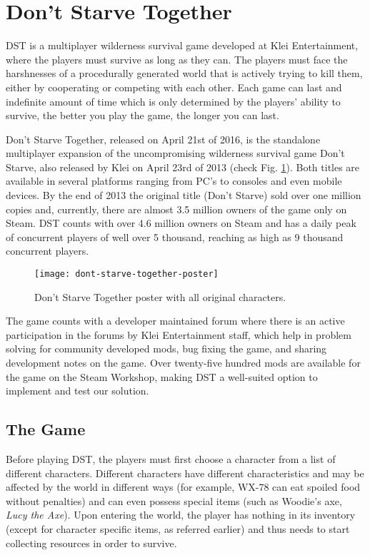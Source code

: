 \section{Don't Starve Together}
\ac{DST} is a multiplayer wilderness survival game developed at Klei Entertainment, where the players must survive as long as they can.
The players must face the harshnesses of a procedurally generated world that is actively trying to kill them, either by cooperating or competing with each other.
Each game can last and indefinite amount of time which is only determined by the players' ability to survive, the better you play the game, the longer you can last.

Don't Starve Together, released on April 21st of 2016, is the standalone multiplayer expansion of the uncompromising wilderness survival game Don't Starve, also released by Klei on April 23rd of 2013 (check Fig. \ref{fig:don't-starve-together-poster}).
Both titles are available in several platforms ranging from PC's to consoles and even mobile devices.
By the end of 2013 the original title (Don't Starve) sold over one million copies and, currently, there are almost 3.5 million owners of the game only on Steam.
\ac{DST} counts with over 4.6 million owners on Steam and has a daily peak of concurrent players of well over 5 thousand, reaching as high as 9 thousand concurrent players.

\begin{figure}
  \centering
    \texttt{[image: dont-starve-together-poster]}
  \caption{Don't Starve Together poster with all original characters.}
  \label{fig:don't-starve-together-poster}
\end{figure}

The game counts with a developer maintained forum where there is an active participation in the forums by Klei Entertainment staff, which help in problem solving for community developed mods, bug fixing the game, and sharing development notes on the game.
Over twenty-five hundred mods are available for the game on the Steam Workshop, making \ac{DST} a well-suited option to implement and test our solution.

\subsection{The Game}
Before playing \ac{DST}, the players must first choose a character from a list of different characters.
Different characters have different characteristics and may be affected by the world in different ways (for example, WX-78 can eat spoiled food without penalties) and can even possess special items (such as Woodie's axe, \textit{Lucy the Axe}).
Upon entering the world, the player has nothing in its inventory (except for character specific items, as referred earlier) and thus needs to start collecting resources in order to survive.

